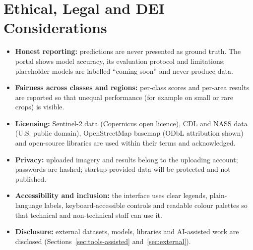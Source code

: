 \section{Ethical, Legal and DEI Considerations}
\begin{itemize}
  \item \textbf{Honest reporting:} predictions are never presented as ground truth. The portal
        shows model accuracy, its evaluation protocol and limitations; placeholder models are
        labelled ``coming soon'' and never produce data.
  \item \textbf{Fairness across classes and regions:} per-class scores and per-area results are
        reported so that unequal performance (for example on small or rare crops) is visible.
  \item \textbf{Licensing:} Sentinel-2 data (Copernicus open licence), CDL and NASS data (U.S.
        public domain), OpenStreetMap basemap (ODbL attribution shown) and open-source libraries
        are used within their terms and acknowledged.
  \item \textbf{Privacy:} uploaded imagery and results belong to the uploading account; passwords
        are hashed; startup-provided data will be protected and not published.
  \item \textbf{Accessibility and inclusion:} the interface uses clear legends, plain-language
        labels, keyboard-accessible controls and readable colour palettes so that technical and
        non-technical staff can use it.
  \item \textbf{Disclosure:} external datasets, models, libraries and AI-assisted work are
        disclosed (Sections~\ref{sec:tools-assisted} and~\ref{sec:external}).
\end{itemize}
